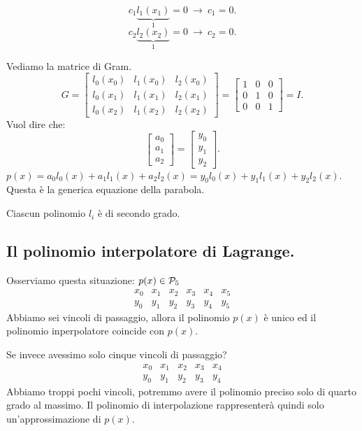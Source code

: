 \begin{ese}
\begin{dimo}
\[c_1\underbrace{l_1(x_1)}_{1} = 0\ \longrightarrow\ c_1=0.\]
\[c_2\underbrace{l_2(x_2)}_{1} = 0\ \longrightarrow\ c_2=0.\]
\end{dimo}
Vediamo la matrice di Gram.
\[
G = \left[\begin{array}{ccc}
l_0(x_0) & l_1(x_0) & l_2(x_0) \\
l_0(x_1) & l_1(x_1) & l_2(x_1) \\
l_0(x_2) & l_1(x_2) & l_2(x_2)
\end{array}\right] =
\left[\begin{array}{ccc}
1 & 0 & 0 \\
0 & 1 & 0 \\
0 & 0 & 1
\end{array}\right] = I.
\]
Vuol dire che:
\[\left[\begin{array}{c}
 a_0 \\ a_1 \\ a_2
\end{array}\right] =
\left[\begin{array}{c}
y_0 \\ y_1 \\ y_2
\end{array}\right].\]
$p(x) = a_0l_0(x)+a_1l_1(x)+a_2l_2(x) = y_0l_0(x)+ y_1l_1(x)+y_2l_2(x)$.
Questa è la generica equazione della parabola.
\begin{osse}Ciascun polinomio $l_i$ è di secondo grado.
\end{osse}
\end{ese}

\subsection{Il polinomio interpolatore di Lagrange.}
Osserviamo questa situazione: $p(x) \in \mathcal{P}_5$
\[\begin{array}{cccccc}
x_0 & x_1 & x_2 & x_3 & x_4  & x_5 \\
y_0 & y_1 & y_2 & y_3 & y_4  & y_5
\end{array}\]
Abbiamo sei vincoli di passaggio, allora il polinomio $p(x)$ è unico ed
il polinomio inperpolatore coincide con $p(x)$.

Se invece avessimo solo cinque vincoli di passaggio?
\[\begin{array}{ccccc}
x_0 & x_1 & x_2 & x_3 & x_4   \\
y_0 & y_1 & y_2 & y_3 & y_4
\end{array}\]
Abbiamo troppi pochi vincoli, potremmo avere il polinomio preciso solo di
quarto grado al massimo. Il polinomio di interpolazione rappresenterà quindi
solo un'approssimazione di $p(x)$.

